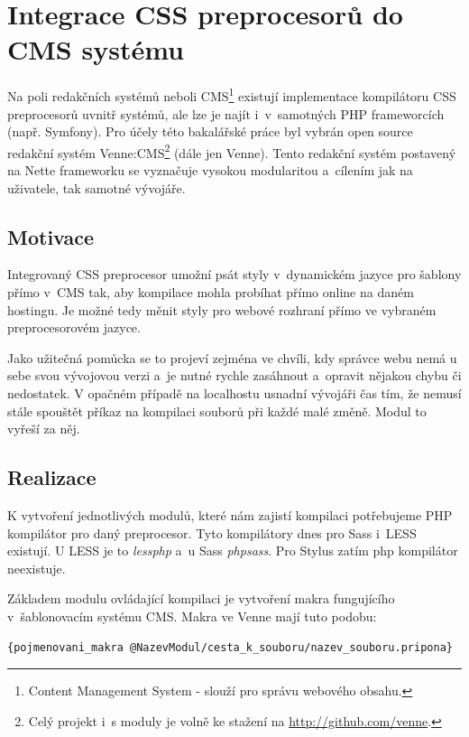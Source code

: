 \documentclass[thesis=B,czech]{FITthesis}[2012/06/26]
\begin{document}
\section{Integrace CSS preprocesorů do CMS systému}
\label{sec:cms}

Na poli redakčních systémů neboli CMS\footnote{Content Management System - slouží pro správu webového obsahu.} existují implementace kompilátoru CSS preprocesorů uvnitř systémů, ale lze je najít i~v~samotných PHP frameworcích (např. Symfony). Pro účely této bakalářské práce byl vybrán open source redakční systém Venne:CMS\footnote{Celý projekt i~s moduly je volně ke stažení na \url{http://github.com/venne}.} (dále jen Venne). Tento redakční systém postavený na Nette frameworku se vyznačuje vysokou modularitou a~cílením jak na uživatele, tak samotné vývojáře.



\subsection{Motivace}

Integrovaný CSS preprocesor umožní psát styly v~dynamickém jazyce pro šablony přímo v~CMS tak, aby kompilace mohla probíhat přímo online na daném hostingu. Je možné tedy měnit styly pro webové rozhraní přímo ve vybraném preprocesorovém jazyce. 

Jako užitečná pomůcka se to projeví zejména ve chvíli, kdy správce webu nemá u sebe svou vývojovou verzi a~je nutné rychle zasáhnout a~opravit nějakou chybu či nedostatek. V opačném případě na localhostu usnadní vývojáři čas tím, že nemusí stále spouštět příkaz na kompilaci souborů při každé malé změně. Modul to vyřeší za něj. 



\subsection{Realizace}

K vytvoření jednotlivých modulů, které nám zajistí kompilaci potřebujeme PHP kompilátor pro daný preprocesor. Tyto kompilátory dnes pro Sass i~LESS existují. U LESS je to \textit{lessphp} a~u Sass \textit{phpsass}. Pro Stylus zatím php kompilátor neexistuje.
 
Základem modulu ovládající kompilaci je vytvoření makra fungujícího v~šablonovacím systému CMS. Makra ve Venne mají tuto podobu:
\scriptsize
\begin{verbatim}
{pojmenovani_makra @NazevModul/cesta_k_souboru/nazev_souboru.pripona}
\end{verbatim}
\normalsize
\end{document}
